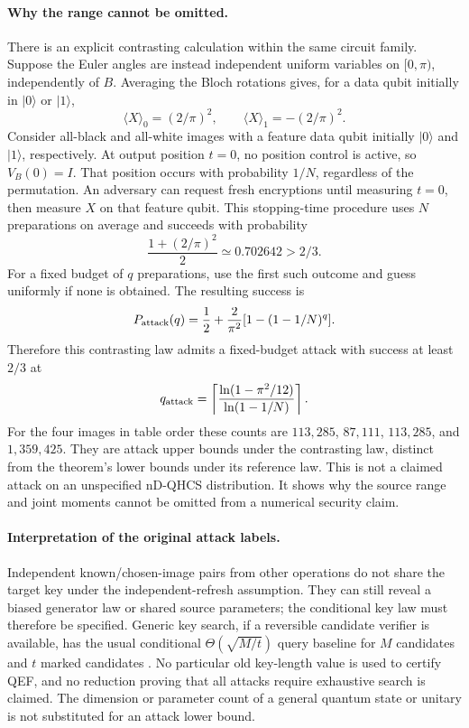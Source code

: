 {\paragraph{Why the range cannot be omitted.}
There is an explicit contrasting calculation within the same circuit
family. Suppose the Euler angles are instead independent uniform
variables on $[0,\pi)$, independently of $B$. Averaging the Bloch
rotations gives, for a data qubit initially in $|0\rangle$ or
$|1\rangle$,
\begin{equation}
 \langle X\rangle_0=(2/\pi)^2,\qquad
 \langle X\rangle_1=-(2/\pi)^2.
\end{equation}
Consider all-black and all-white images with a feature data qubit
initially $|0\rangle$ and $|1\rangle$, respectively. At output position
$t=0$, no position control is active, so $V_B(0)=I$. That position
occurs with probability $1/N$, regardless of the permutation.
An adversary can request fresh encryptions until measuring $t=0$,
then measure $X$ on that feature qubit. This stopping-time procedure
uses $N$ preparations on average and succeeds with probability
\begin{equation}
 \frac{1+(2/\pi)^2}{2}\simeq0.702642>2/3.
\end{equation}
For a fixed budget of $q$ preparations, use the first such outcome
and guess uniformly if none is obtained. The resulting success is
\begin{equation}
 P_{\rm attack}(q)=\frac12+\frac{2}{\pi^2}
      [1-(1-1/N)^q].
\end{equation}
Therefore this contrasting law admits a fixed-budget attack with
success at least $2/3$ at
\begin{equation}
 q_{\rm attack}=\left\lceil
 \frac{\ln(1-\pi^2/12)}{\ln(1-1/N)}\right\rceil.
\end{equation}
For the four images in table order these counts are $113,285$,
$87,111$, $113,285$, and $1,359,425$. They are attack upper bounds
under the contrasting law, distinct from the theorem's lower bounds
under its reference law. This is not a claimed attack on an
unspecified nD-QHCS distribution. It shows why the source range and
joint moments cannot be omitted from a numerical security claim.



\paragraph{Interpretation of the original attack labels.}
Independent known/chosen-image pairs from other operations do not
share the target key under the independent-refresh assumption. They
can still reveal a biased generator law or shared source parameters;
the conditional key law must therefore be specified. Generic key
search, if a reversible candidate verifier is available, has the
usual conditional $\Theta(\sqrt{M/t})$ query baseline for $M$ candidates
and $t$ marked candidates \cite{GDO,Boyer1998QEF,Zalka1999QEF}.
No particular old key-length value is used to certify QEF, and no
reduction proving that all attacks require exhaustive search is
claimed. The dimension or parameter count of a general quantum state
or unitary is not substituted for an attack lower bound.

}
